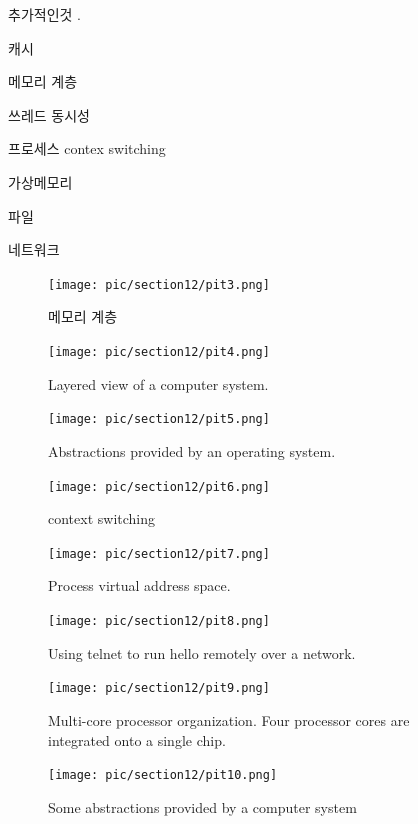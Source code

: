 \documentclass[chapter,oneside]{oblivoir}
\begin{document}
추가적인것 .

캐시

메모리 계층

쓰레드 동시성

프로세스 contex switching

가상메모리

파일

네트워크


\begin{figure}[h!]
    \centering
    \texttt{[image: pic/section12/pit3.png]}
    \caption{메모리 계층}
\end{figure}



\begin{figure}[h!]
    \centering
    \texttt{[image: pic/section12/pit4.png]}
    \caption{Layered view of a computer system.}
\end{figure}



\begin{figure}[h!]
    \centering
    \texttt{[image: pic/section12/pit5.png]}
    \caption{Abstractions provided by an operating system.}
\end{figure}


\begin{figure}[h!]
    \centering
    \texttt{[image: pic/section12/pit6.png]}
    \caption{context switching}
\end{figure}

\begin{figure}[h!]
    \centering
    \texttt{[image: pic/section12/pit7.png]}
    \caption{Process virtual address space.}
\end{figure}

\begin{figure}[h!]
    \centering
    \texttt{[image: pic/section12/pit8.png]}
    \caption{Using telnet to run hello remotely over a network.}
\end{figure}

\begin{figure}[h!]
    \centering
    \texttt{[image: pic/section12/pit9.png]}
    \caption{Multi-core processor organization. Four processor cores are integrated onto a single chip.}
\end{figure}


\begin{figure}[h!]
    \centering
    \texttt{[image: pic/section12/pit10.png]}
    \caption{Some abstractions provided by a computer system}
\end{figure}
\end{document}
